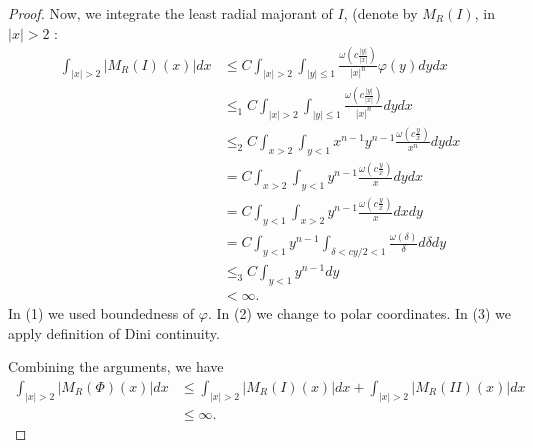 \begin{enumerate}
\begin{proof}
	 Now, we integrate the least radial majorant of $I$, (denote by $M_R(I)$, in $|x| > 2$ :
	 \begin{align*}
	 	\int _{|x| > 2}|M_R(I)(x)| d x
		&\leq C \int _{|x| > 2} \int _{|y|\le 1} \frac{\omega\left( c \frac{|y|}{|x|} \right) }{|x|^n} \varphi(y) d y  d x\\
		&\leq_1 C \int _{|x| > 2} \int _{|y|\le 1} \frac{\omega\left( c \frac{|y|}{|x|} \right) }{|x|^n} d y  d x\\
		&\leq_2 C \int _{x>2} \int _{y<1} x^{n - 1} y^{n - 1}\frac{\omega\left( c \frac{y}{x} \right) }{x^n} d y  d x\\
		&= C \int _{x>2} \int _{y<1} y^{n - 1}\frac{\omega\left( c \frac{y}{x} \right) }{x} d y  d x\\
		&= C  \int _{y<1} \int _{x>2} y^{n - 1}\frac{\omega\left( c \frac{y}{x} \right) }{x}   d x d y\\
		&= C  \int _{y<1} y^{n - 1}\int _{\delta < c y / 2 < 1} \frac{\omega\left( \delta\right) }{\delta}   d \delta d y\\
		&\leq_3 C \int _{y < 1} y^{n - 1} d y \\
		&< \infty 
	 .\end{align*} 
	 In (1) we used boundedness of $\varphi$. In (2) we change to polar coordinates. In (3) we apply definition of Dini continuity.

	 Combining the arguments, we have
	 \begin{align*}
	 	\int _{|x| > 2} \left| M_R(\Phi)(x) \right|  d x 
		&\leq \int _{|x| > 2} |M_R(I)(x)| dx + \int _{|x| > 2} |M_R(II)(x)| dx \\
		&\leq \infty 
	 .\end{align*}
\end{proof}




\end{enumerate}

